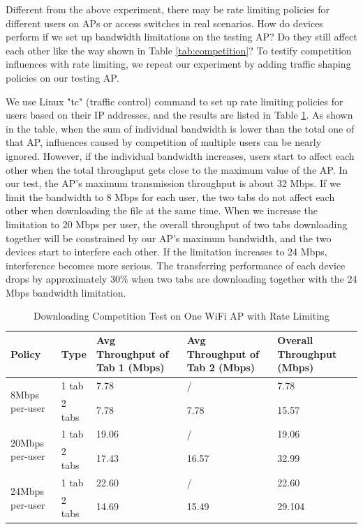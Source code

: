 \documentclass[english]{tktltiki}
\begin{document}
Different from the above experiment, there may be rate limiting policies for different users on APs or access switches in real scenarios. How do devices perform if we set up bandwidth limitations on the testing AP? Do they still affect each other like the way shown in Table \ref{tab:competition}? To testify competition influences with rate limiting, we repeat our experiment by adding traffic shaping policies on our testing AP. 

We use Linux "tc" (traffic control) command to set up rate limiting policies for users based on their IP addresses, and the results are listed in Table \ref{tab:competition-tc}. As shown in the table, when the sum of individual bandwidth is lower than the total one of that AP, influences caused by competition of multiple users can be nearly ignored. However, if the individual bandwidth  increases, users start to affect each other when the total throughput gets close to the maximum value of the AP. In our test, the AP's maximum transmission throughput is about 32 Mbps. If we limit the bandwidth to 8 Mbps for each user, the two tabs do not affect each other when downloading the file at the same time. When we increase the limitation to 20 Mbps per user, the overall throughput of two tabs downloading together will be constrained by our AP's maximum bandwidth, and the two devices start to interfere each other. If the limitation increases to 24 Mbps, interference becomes more serious. The transferring performance of each device drops by approximately 30\% when two tabs are downloading together with the 24 Mbps bandwidth limitation. 

\begin{table}
  \centering
  \begin{tabular}{|p{45pt}|p{35pt}|p{90pt}|p{90pt}|p{95pt}|}
    \hline
    \textbf{Policy} & \textbf{Type} & \textbf{Avg Throughput of Tab 1 (Mbps)} & \textbf{Avg Throughput of Tab 2 (Mbps)} & \textbf{Overall Throughput (Mbps)} \\    
    \hline
    \multirow{2}{45pt}{8Mbps per-user} & 1 tab & 7.78 & / & 7.78 \\
    \cline{2-5}
    & 2 tabs & 7.78 & 7.78 & 15.57 \\
    \hline
    \multirow{2}{45pt}{20Mbps per-user} & 1 tab & 19.06 & / & 19.06 \\
    \cline{2-5}
    & 2 tabs & 17.43 & 16.57 & 32.99 \\
    \hline
    \multirow{2}{45pt}{24Mbps per-user} & 1 tab & 22.60 & / & 22.60 \\
    \cline{2-5}
    & 2 tabs & 14.69 & 15.49 & 29.104 \\
    \hline
  \end{tabular}
  \caption{Downloading Competition Test on One WiFi AP with Rate Limiting}
  \label{tab:competition-tc}
\end{table}
\end{document}
